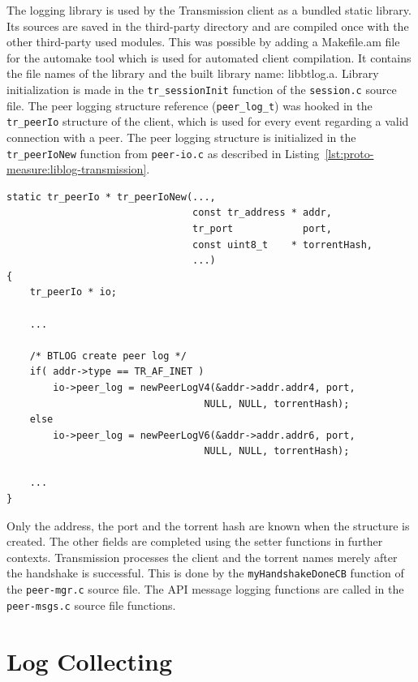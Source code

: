 The logging library is used by the Transmission client as a bundled static
library. Its sources are saved in the third-party directory and are compiled
once with the other third-party used modules. This was possible by adding a
Makefile.am file for the automake tool which is used for automated client
compilation. It contains the file names of the library and the built library
name: libbtlog.a. Library initialization is made in the
\texttt{tr\_sessionInit}
function of the \texttt{session.c} source file. The peer logging structure reference
(\texttt{peer\_log\_t}) was hooked in the \texttt{tr\_peerIo} structure of the
client, which is used for every event regarding a valid connection with a
peer. The peer logging structure is initialized in the \texttt{tr\_peerIoNew}
function from \texttt{peer-io.c} as described in
Listing~\ref{lst:proto-measure:liblog-transmission}.

\lstset{language=C,caption=Library Logging in
Transmission,label=lst:proto-measure:liblog-transmission}
\begin{lstlisting}
static tr_peerIo * tr_peerIoNew(...,
                                const tr_address * addr,
                                tr_port            port,
                                const uint8_t    * torrentHash,
                                ...)
{
    tr_peerIo * io;

    ...

    /* BTLOG create peer log */
    if( addr->type == TR_AF_INET )
        io->peer_log = newPeerLogV4(&addr->addr.addr4, port, 
                                  NULL, NULL, torrentHash);
    else
        io->peer_log = newPeerLogV6(&addr->addr.addr6, port,
                                  NULL, NULL, torrentHash);

    ...
}
\end{lstlisting}

Only the address, the port and the torrent hash are known when the structure
is created. The other fields are completed using the setter functions in
further contexts. Transmission processes the client and the torrent names
merely after the handshake is successful. This is done by the
\texttt{myHandshakeDoneCB} function of the \texttt{peer-mgr.c} source file.
The API message logging functions are called in the \texttt{peer-msgs.c}
source file functions.

\section{Log Collecting}
\label{sec:proto-measure:log-collect}

